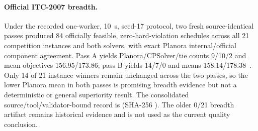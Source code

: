 \paragraph{Official ITC-2007 breadth.}
Under the recorded one-worker, 10~s, seed-17 protocol, two fresh source-identical passes produced 84 officially feasible, zero-hard-violation schedules across all 21 competition instances and both solvers, with exact Planora internal/official component agreement.
Pass A yields Planora/CPSolver/tie counts 9/10/2 and mean objectives 156.95/173.86; pass B yields 14/7/0 and means 158.14/178.38~\cite{muller2009hybrid,unitimeitc2007}.
Only 14 of 21 instance winners remain unchanged across the two passes, so the lower Planora mean in both passes is promising breadth evidence but not a deterministic or general superiority result.
The consolidated source/tool/validator-bound record is  (SHA-256 ).
The older 0/21 breadth artifact remains historical evidence and is not used as the current quality conclusion.

